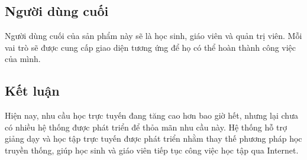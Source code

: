 \documentclass[./../main_file.tex]{subfiles}
\begin{document}
\subsection{Người dùng cuối}
Người dùng cuối của sản phẩm này sẽ là học sinh, giáo viên và quản trị viên. Mỗi vai trò sẽ được cung cấp giao diện tương ứng để họ có thể hoàn thành công việc của mình.
\subsection{Kết luận}
Hiện nay, nhu cầu học trực tuyến đang tăng cao hơn bao giờ hết, nhưng lại chưa có nhiều hệ thống được phát triển để thỏa mãn nhu cầu này. Hệ thống hỗ trợ giảng dạy và học tập trực tuyến được phát triển nhằm thay thế phương pháp học truyền thống, giúp học sinh và giáo viên tiếp tục công việc học tập qua Internet.

	
\end{document}
